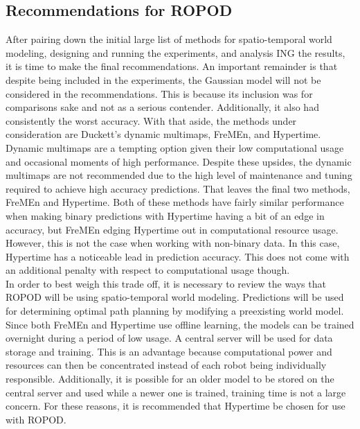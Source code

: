    \subsection{ Recommendations for ROPOD }

    After pairing down the initial large list of methods for spatio-temporal
    world modeling, designing and running the experiments, and analysis ING the
    results, it is time to make the final recommendations. An important remainder
    is that despite being included in the experiments, the Gaussian model will
    not be considered in the recommendations. This is because its inclusion was
    for comparisons sake and not as a serious contender. Additionally, it
    also had consistently the worst accuracy. With that aside, the methods
    under consideration are Duckett's dynamic multimaps, FreMEn, and Hypertime.
    Dynamic multimaps are a tempting option given their low computational
    usage and occasional moments of high performance. Despite these upsides,
    the dynamic multimaps are not recommended due to the high level of maintenance
    and tuning required to achieve high accuracy predictions. That leaves the
    final two methods, FreMEn and Hypertime. Both of these methods have fairly
    similar performance when making binary predictions with Hypertime having a
    bit of an edge in accuracy, but FreMEn edging Hypertime out in computational
    resource usage. However, this is not the case when working with non-binary
    data. In this case, Hypertime has a noticeable lead in prediction accuracy.
    This does not come with an additional penalty with respect to computational
    usage though. \\

    In order to best weigh this trade off, it is necessary to review the ways
    that ROPOD will be using spatio-temporal world modeling. Predictions will
    be used for determining optimal path planning by modifying a preexisting
    world model. Since both FreMEn and Hypertime use offline learning, the models
    can be trained overnight during a period of low usage. A central server
    will be used for data storage and training. This is an advantage because
    computational power and resources can then be concentrated instead of each
    robot being individually responsible. Additionally, it is
    possible for an older model to be stored on the central server and used
    while a newer one is trained, training time is not a large concern. For
    these reasons, it is recommended that Hypertime be chosen for use with
    ROPOD. \\


